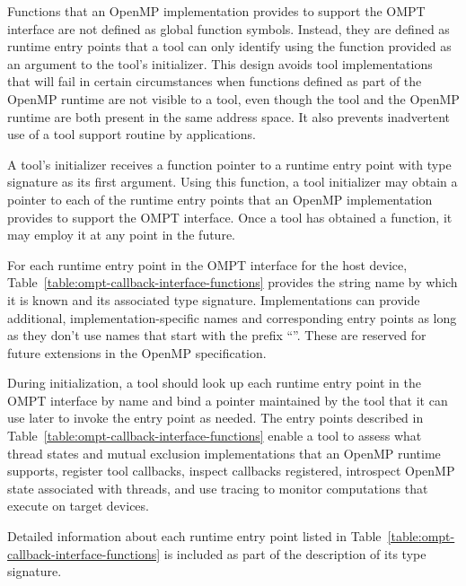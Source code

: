 Functions that an OpenMP implementation provides to support the OMPT interface
are not defined as global function symbols. Instead, they are defined as runtime entry points
that a tool can only identify using the  function provided as an
argument to the tool's initializer. This design avoids tool
implementations that
will fail in certain circumstances when functions defined as part of
the OpenMP runtime are not visible to a tool, even though the tool and
the OpenMP runtime are both present in the same address space.
It also prevents inadvertent use of a tool support routine by
applications.

A tool's initializer receives a function pointer to a 
runtime entry point with type signature
 as its first argument. Using this
function, a tool initializer may obtain a pointer to each of the
runtime entry points that an OpenMP implementation provides to support
the OMPT interface. Once a tool has obtained a
 function, it may employ it at any point in the future.

For each runtime entry point in the OMPT interface for the host device,
Table~\ref{table:ompt-callback-interface-functions} provides the string
name by which it is known and its associated type signature. Implementations
can provide additional, implementation-specific names and corresponding
entry points as long as they don't use names that start with the prefix
``''. These are reserved for future extensions in the
OpenMP specification.

During initialization, a tool should look up each runtime entry point in the
OMPT interface by name and bind a pointer maintained by the tool
that it can use later to invoke the entry point as needed. The entry points
described in Table~\ref{table:ompt-callback-interface-functions}
enable a tool to assess
what thread states and mutual exclusion implementations that an OpenMP runtime supports,
register tool callbacks, inspect callbacks registered,
introspect OpenMP state associated with threads, and use tracing to monitor
computations that execute on target devices.

Detailed information about each runtime entry point listed in
Table~\ref{table:ompt-callback-interface-functions} is included as
part of the description of its type signature.

